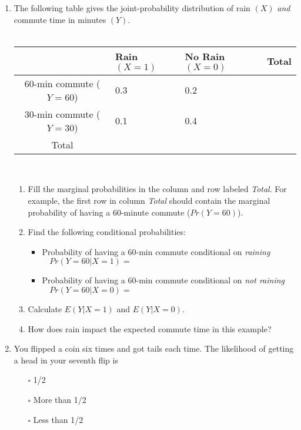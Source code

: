\documentclass{./../../Latex/handout}
\begin{document}
\newpage
\begin{enumerate}
\item The following table gives the joint-probability distribution of rain $(X)$ \textit{and} commute time in minutes $(Y)$. \\~\\
\renewcommand{\arraystretch}{1.75}
\begin{tabularx}{0.95\textwidth}{cYYc}
\toprule
	& Rain $(X=1)$ & No Rain $(X=0)$ & Total \\
	-min commute ($Y=60$) & 0.3  & 0.2 \\ 
30-min commute ($Y=30$) & 0.1 & 0.4 \\
\midrule
 Total & &  & \\
 \bottomrule
\end{tabularx} \\ 

\begin{enumerate}
  \item Fill the marginal probabilities in the column and row labeled \textit{Total}. For example, the first row in column \textit{Total} should contain the marginal probability of having a 60-minute commute ($Pr(Y=60)$). \\
  \item Find the following conditional probabilities: \vspace{0.5em}
  \begin{itemize}
 \item Probability of having a 60-min commute conditional on \textit{raining} \vspace{0.25cm}
 $$ Pr(Y=60| X=1)  = \hspace{8cm} $$ \vspace{0.25em}
  \item Probability of having a 60-min commute conditional on \textit{not raining} \vspace{0.25cm}
   $$ Pr(Y=60| X=0) = \hspace{8cm} $$ \vspace{0.25em}
\end{itemize}
\item Calculate $E(Y| X=1)$ and $E(Y| X=0)$. \vspace{5cm}
\item How does rain impact the expected commute time in this example? \vspace{3cm}
\end{enumerate}

\item You flipped a coin six times and got tails each time. The likelihood of getting a head in your seventh flip is
\begin{enumerate}
\item[$\square$] 1/2
\item[$\square$] More than 1/2
\item[$\square$] Less than 1/2 \\~\\
\end{enumerate}


\end{enumerate}
\end{document}
